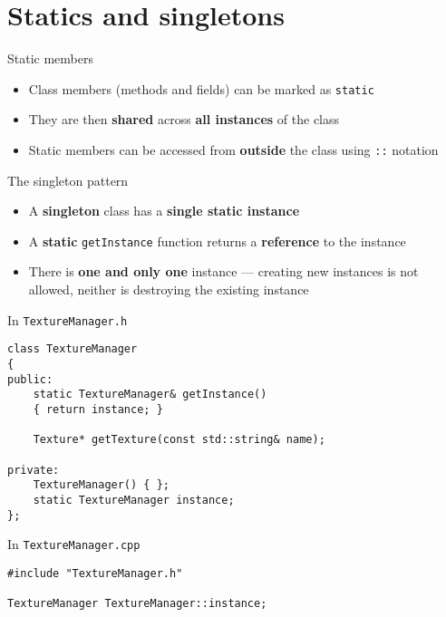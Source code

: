 \part{Statics and singletons}
\frame{\partpage}

\begin{frame}{Static members}
    \begin{itemize}
        \item Class members (methods and fields) can be marked as \lstinline{static} \pause
        \item They are then \textbf{shared} across \textbf{all instances} of the class \pause
        \item Static members can be accessed from \textbf{outside} the class using \lstinline{::} notation
    \end{itemize}
\end{frame}

\begin{frame}[fragile]{The singleton pattern}
    \begin{itemize}
        \item A \textbf{singleton} class has a \textbf{single static instance} \pause
        \item A \textbf{static} \lstinline{getInstance} function returns a \textbf{reference} to the instance \pause
        \item There is \textbf{one and only one} instance --- creating new instances is not allowed,
            neither is destroying the existing instance
    \end{itemize}
\end{frame}

\begin{frame}[fragile]
    In \texttt{TextureManager.h}
    \begin{lstlisting}
class TextureManager
{
public:
    static TextureManager& getInstance()
    { return instance; }
    
    Texture* getTexture(const std::string& name);
    
private:
    TextureManager() { };
    static TextureManager instance;
};
    \end{lstlisting} \pause
    In \texttt{TextureManager.cpp}
    \begin{lstlisting}
#include "TextureManager.h"

TextureManager TextureManager::instance;
    \end{lstlisting}
\end{frame}

